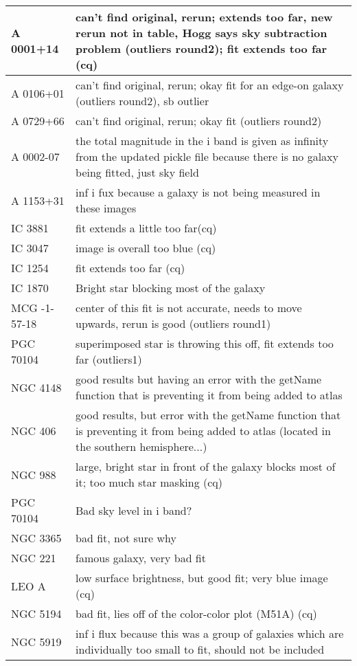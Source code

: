 \documentclass[10pt]{article}
\begin{document}
\begin{landscape}
\begin{longtable}{|l|l|}\hline
A 0001+14 & can't find original, rerun; extends too far, new rerun not in table, Hogg says sky subtraction problem (outliers round2); fit extends too far (cq) \\ \hline
A 0106+01 & can't find original, rerun; okay fit for an edge-on galaxy (outliers round2), sb outlier \\ \hline
A 0729+66 & can't find original, rerun; okay fit (outliers round2)\\ \hline
A 0002-07 & the total magnitude in the i band is given as infinity from the updated pickle file because there is no galaxy being fitted, just sky field \\ \hline
A 1153+31 & inf i fux because a galaxy is not being measured in these images \\ \hline
IC 3881 & fit extends a little too far(cq) \\ \hline
IC 3047 & image is overall too blue (cq) \\ \hline
IC 1254 & fit extends too far (cq) \\ \hline
IC 1870 & Bright star blocking most of the galaxy \\ \hline
MCG -1-57-18 & center of this fit is not accurate, needs to move upwards, rerun is good (outliers round1)\\ \hline
PGC 70104 & superimposed star is throwing this off, fit extends too far (outliers1)  \\ \hline
NGC 4148 & good results but having an error with the getName function that is preventing it from being added to atlas\\ \hline
NGC 406 & good results, but error with the getName function that is preventing it from being added to atlas (located in the southern hemisphere...)\\ \hline
NGC 988 & large, bright star in front of the galaxy blocks most of it; too much star masking (cq)\\ \hline
PGC 70104 & Bad sky level in i band?\\ \hline
NGC 3365 & bad fit, not sure why\\ \hline
NGC 221 & famous galaxy, very bad fit\\ \hline 
LEO A & low surface brightness, but good fit; very blue image (cq)\\ \hline
NGC 5194 & bad fit, lies off of the color-color plot (M51A) (cq) \\ \hline
NGC 5919 &inf i flux because this was a group of galaxies which are individually too small to fit, should not be included \\ \hline

\end{longtable}
\end{landscape}
\end{document}
